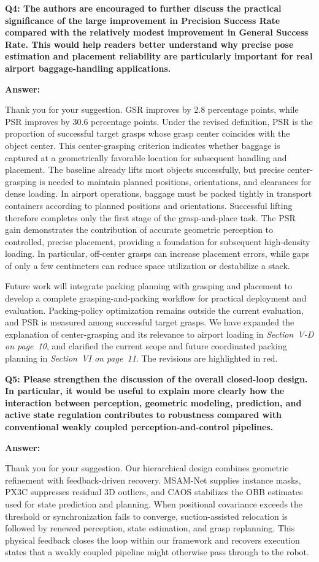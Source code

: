 \documentclass[journal,10pt]{IEEEtran}
\newcommand{\question}[2]{%
  \par\smallskip\noindent
  {\color{responseblue}\bfseries\clubpenalty=10000\widowpenalty=10000 Q#1: #2\par}%
  \par\nobreak\noindent
}
\newcommand{\answer}{%
  \par\smallskip\noindent
  \textbf{Answer: }\ignorespaces
}
\begin{document}
\question{4}{The authors are encouraged to further discuss the practical significance of the large improvement in Precision Success Rate compared with the relatively modest improvement in General Success Rate. This would help readers better understand why precise pose estimation and placement reliability are particularly important for real airport baggage-handling applications.}

\answer
Thank you for your suggestion. GSR improves by 2.8 percentage points, while PSR improves by 30.6 percentage points. Under the revised definition, PSR is the proportion of successful target grasps whose grasp center coincides with the object center. This center-grasping criterion indicates whether baggage is captured at a geometrically favorable location for subsequent handling and placement. The baseline already lifts most objects successfully, but precise center-grasping is needed to maintain planned positions, orientations, and clearances for dense loading. In airport operations, baggage must be packed tightly in transport containers according to planned positions and orientations. Successful lifting therefore completes only the first stage of the grasp-and-place task. The PSR gain demonstrates the contribution of accurate geometric perception to controlled, precise placement, providing a foundation for subsequent high-density loading. In particular, off-center grasps can increase placement errors, while gaps of only a few centimeters can reduce space utilization or destabilize a stack.

Future work will integrate packing planning with grasping and placement to develop a complete grasping-and-packing workflow for practical deployment and evaluation. Packing-policy optimization remains outside the current evaluation, and PSR is measured among successful target grasps. We have expanded the explanation of center-grasping and its relevance to airport loading in \textit{Section~V-D on page~10}, and clarified the current scope and future coordinated packing planning in \textit{Section~VI on page~11}. The revisions are highlighted in red.

\question{5}{Please strengthen the discussion of the overall closed-loop design. In particular, it would be useful to explain more clearly how the interaction between perception, geometric modeling, prediction, and active state regulation contributes to robustness compared with conventional weakly coupled perception-and-control pipelines.}

\answer
Thank you for your suggestion. Our hierarchical design combines geometric refinement with feedback-driven recovery. MSAM-Net supplies instance masks, PX3C suppresses residual 3D outliers, and CAOS stabilizes the OBB estimates used for state prediction and planning. When positional covariance exceeds the threshold or synchronization fails to converge, suction-assisted relocation is followed by renewed perception, state estimation, and grasp replanning. This physical feedback closes the loop within our framework and recovers execution states that a weakly coupled pipeline might otherwise pass through to the robot.
\end{document}
